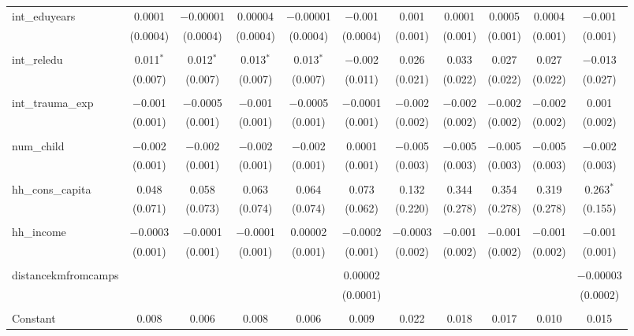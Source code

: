 \begin{table}[H]
\begin{tabular}{@{\extracolsep{4pt}}lcccccccccc}
 int\_eduyears & 0.0001 & $-$0.00001 & 0.00004 & $-$0.00001 & $-$0.001 & 0.001 & 0.0001 & 0.0005 & 0.0004 & $-$0.001 \\ 
  & (0.0004) & (0.0004) & (0.0004) & (0.0004) & (0.0004) & (0.001) & (0.001) & (0.001) & (0.001) & (0.001) \\ 
  & & & & & & & & & & \\ 
 int\_reledu & 0.011$^{*}$ & 0.012$^{*}$ & 0.013$^{*}$ & 0.013$^{*}$ & $-$0.002 & 0.026 & 0.033 & 0.027 & 0.027 & $-$0.013 \\ 
  & (0.007) & (0.007) & (0.007) & (0.007) & (0.011) & (0.021) & (0.022) & (0.022) & (0.022) & (0.027) \\ 
  & & & & & & & & & & \\ 
 int\_trauma\_exp & $-$0.001 & $-$0.0005 & $-$0.001 & $-$0.0005 & $-$0.0001 & $-$0.002 & $-$0.002 & $-$0.002 & $-$0.002 & 0.001 \\ 
  & (0.001) & (0.001) & (0.001) & (0.001) & (0.001) & (0.002) & (0.002) & (0.002) & (0.002) & (0.002) \\ 
  & & & & & & & & & & \\ 
 num\_child & $-$0.002 & $-$0.002 & $-$0.002 & $-$0.002 & 0.0001 & $-$0.005 & $-$0.005 & $-$0.005 & $-$0.005 & $-$0.002 \\ 
  & (0.001) & (0.001) & (0.001) & (0.001) & (0.001) & (0.003) & (0.003) & (0.003) & (0.003) & (0.003) \\ 
  & & & & & & & & & & \\ 
 hh\_cons\_capita & 0.048 & 0.058 & 0.063 & 0.064 & 0.073 & 0.132 & 0.344 & 0.354 & 0.319 & 0.263$^{*}$ \\ 
  & (0.071) & (0.073) & (0.074) & (0.074) & (0.062) & (0.220) & (0.278) & (0.278) & (0.278) & (0.155) \\ 
  & & & & & & & & & & \\ 
 hh\_income & $-$0.0003 & $-$0.0001 & $-$0.0001 & 0.00002 & $-$0.0002 & $-$0.0003 & $-$0.001 & $-$0.001 & $-$0.001 & $-$0.001 \\ 
  & (0.001) & (0.001) & (0.001) & (0.001) & (0.001) & (0.002) & (0.002) & (0.002) & (0.002) & (0.001) \\ 
  & & & & & & & & & & \\ 
 distancekmfromcamps &  &  &  &  & 0.00002 &  &  &  &  & $-$0.00003 \\ 
  &  &  &  &  & (0.0001) &  &  &  &  & (0.0002) \\ 
  & & & & & & & & & & \\ 
 Constant & 0.008 & 0.006 & 0.008 & 0.006 & 0.009 & 0.022 & 0.018 & 0.017 & 0.010 & 0.015 \\ 

\end{tabular}
\end{table}
